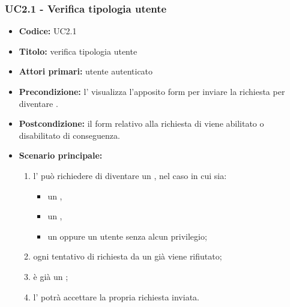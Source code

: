\documentclass[casi-duso]{subfiles}
\begin{document}
\subsubsection{UC2.1 - Verifica tipologia utente}
\label{subsub:UC2.1}
\begin{itemize}
  \item \textbf{Codice:} UC2.1
  \item \textbf{Titolo:} verifica tipologia utente
  \item \textbf{Attori primari:} utente autenticato
  \item \textbf{Precondizione:} l' visualizza l'apposito form per inviare la richiesta per diventare .
  \item \textbf{Postcondizione:} il form relativo alla richiesta di  viene abilitato o disabilitato di conseguenza.
  \item \textbf{Scenario principale:} 
  \begin{enumerate}
    \item l' può richiedere di diventare un , nel caso in cui sia:
    \begin{itemize}
      \item un ,
      \item un ,
      \item un  oppure un utente senza alcun privilegio;
    \end{itemize}
    \item ogni tentativo di richiesta da un già  viene rifiutato;
    \item {} è già un ;
    \item l' potrà accettare la propria richiesta inviata.
  \end{enumerate}
\end{itemize}
\end{document}
